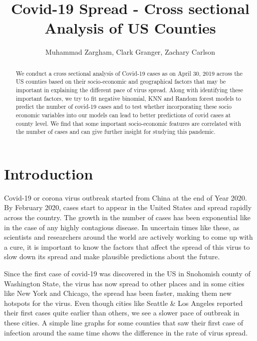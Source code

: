 \documentclass[
]{article}
\title{Covid-19 Spread - Cross sectional Analysis of US Counties}
\author{Muhammad Zargham, Clark Granger, Zachary Carlson}
\date{}
\begin{document}
\maketitle

\begin{abstract}
We conduct a cross sectional analysis of Covid-19 cases as on April 30, 2019 across the US counties based on their socio-economic and geographical factors that may be important in explaining the different pace of virus spread. Along with identifying these important factors, we try to fit negative binomial, KNN and Random forest models to predict the number of covid-19 cases and to test whether incorporating these socio economic variables into our models can lead to better predictions of covid cases at county level. We find that some important socio-economic features are correlated with the number of cases and can give further insight for studying this pandemic.  
\end{abstract}
\newpage

{
\setcounter{tocdepth}{2}
\tableofcontents
}
\newpage

\hypertarget{introduction}{%
\section{Introduction}\label{introduction}}

Covid-19 or corona virus outbreak started from China at the end of Year
2020. By February 2020, cases start to appear in the United States and
spread rapidly across the country. The growth in the number of cases has
been exponential like in the case of any highly contagious disease. In
uncertain times like these, as scientists and researchers around the
world are actively working to come up with a cure, it is important to
know the factors that affect the spread of this virus to slow down its
spread and make plausible predictions about the future.

Since the first case of covid-19 was discovered in the US in Snohomish
county of Washington State, the virus has now spread to other places and
in some cities like New York and Chicago, the spread has been faster,
making them new hotspots for the virus. Even though cities like Seattle
\& Los Angeles reported their first cases quite earlier than others, we
see a slower pace of outbreak in these cities. A simple line graphs for
some counties that saw their first case of infection around the same
time shows the difference in the rate of virus spread.
\end{document}
